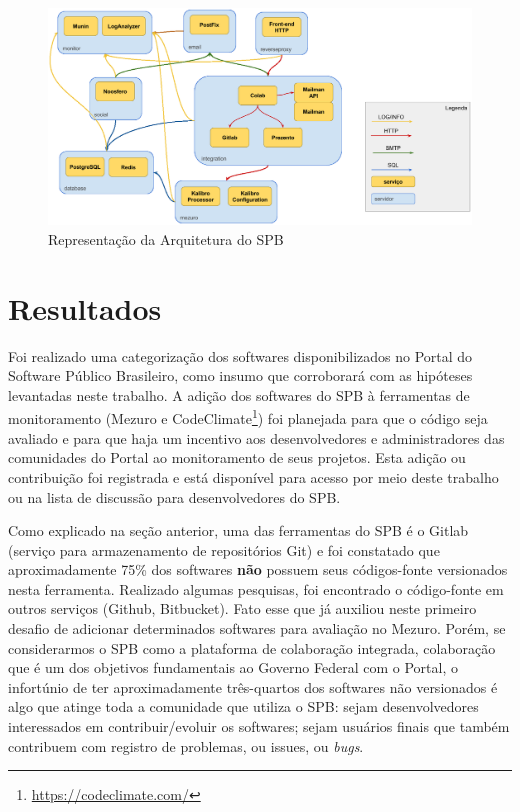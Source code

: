 \begin{figure}[!htb]
	\centering
    \includegraphics[keepaspectratio=true,scale=0.3]
    {figuras/arquitetura_spb.eps}
  \caption{Representação da Arquitetura do SPB}
  \label{fig:arquitetura_spb}
\end{figure}

\section{Resultados}

Foi realizado uma categorização dos softwares disponibilizados no Portal do
Software Público Brasileiro, como insumo que corroborará com as hipóteses
levantadas neste trabalho. A adição dos softwares do SPB à ferramentas de
monitoramento (Mezuro e CodeClimate\footnote{\url{https://codeclimate.com/}})
foi planejada para que o código seja avaliado e para que haja um incentivo aos
desenvolvedores e administradores das comunidades do Portal ao monitoramento de
seus projetos. Esta adição ou contribuição foi registrada e está disponível
para acesso por meio deste trabalho ou na lista de discussão para
desenvolvedores do SPB.

Como explicado na seção anterior, uma das ferramentas do SPB é o Gitlab
(serviço para armazenamento de repositórios Git) e foi constatado que
aproximadamente 75\% dos softwares \textbf{não} possuem seus códigos-fonte
versionados nesta ferramenta. Realizado algumas pesquisas, foi encontrado o
código-fonte em outros serviços (Github, Bitbucket). Fato esse que já auxiliou
neste primeiro desafio de adicionar determinados softwares para avaliação no
Mezuro. Porém, se considerarmos o SPB como a plataforma de colaboração
integrada, colaboração que é um dos objetivos fundamentais ao Governo Federal
com o Portal, o infortúnio de ter aproximadamente três-quartos dos softwares
não versionados é algo que atinge toda a comunidade que utiliza o SPB: sejam
desenvolvedores interessados em contribuir/evoluir os softwares; sejam usuários
finais que também contribuem com registro de problemas, ou issues, ou \textit{bugs}.

